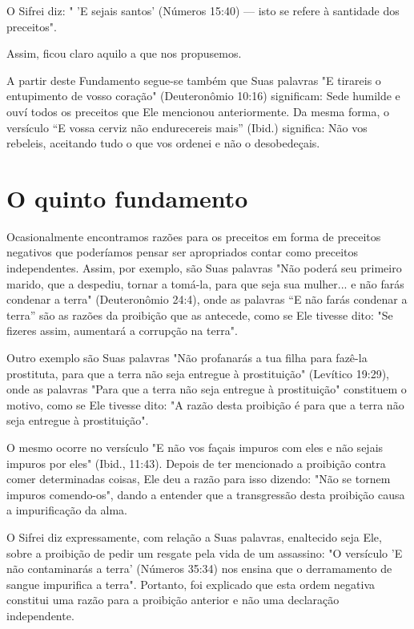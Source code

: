 O Sifrei diz: " 'E sejais santos' (Números 15:40) --- isto se refere à
santidade dos preceitos".

Assim, ficou claro aquilo a que nos propusemos.

A partir deste Fundamento segue-se também que Suas palavras "E tirareis
o entupimento de vosso coração" (Deuteronômio 10:16) significam: Sede
humilde e ouví todos os preceitos que Ele mencionou anteriormente. Da
mes­ma forma, o versículo ``E vossa cerviz não endurecereis mais'' (Ibid.)
significa: Não vos rebeleis, aceitando tudo o que vos ordenei e não o
desobedeçais.

\chapter*{O quinto fundamento}

Ocasionalmente encontramos razões para os preceitos em forma de
preceitos negativos que poderíamos pensar ser apropriados contar como
pre­ceitos independentes. Assim, por exemplo, são Suas palavras "Não
poderá seu primeiro marido, que a despediu, tornar a tomá-la, para que
seja sua mulher... e não farás condenar a terra" (Deuteronômio 24:4),
onde as palavras ``E não farás condenar a terra'' são as razões da
proibição que as antecede, como se Ele tivesse dito: "Se fizeres assim,
aumentará a corrupção na terra".

Outro exemplo são Suas palavras "Não profanarás a tua filha para fazê-la
prostituta, para que a terra não seja entregue à prostituição" (Levítico
19:29), onde as palavras "Para que a terra não seja entregue à
prostituição" cons­tituem o motivo, como se Ele tivesse dito: "A razão
desta proibição é para que a terra não seja entregue à prostituição".

O mesmo ocorre no versículo "E não vos façais impuros com eles e não
sejais impuros por eles" (Ibid., 11:43). Depois de ter mencionado a
proibição contra comer determinadas coisas, Ele deu a razão para isso
dizendo: "Não se tornem impuros comendo-os", dando a entender que a
transgressão desta proibição causa a impurificação da alma.

O Sifrei diz expressamente, com relação a Suas palavras, enaltecido seja
Ele, sobre a proibição de pedir um resgate pela vida de um assassino: "O
versículo 'E não contaminarás a terra' (Números 35:34) nos ensina que o
derra­mamento de sangue impurifica a terra". Portanto, foi explicado que
esta or­dem negativa constitui uma razão para a proibição anterior e não
uma declara­ção independente.



